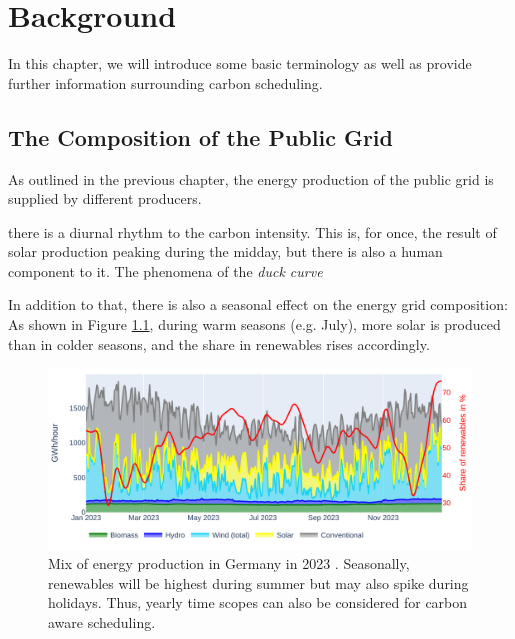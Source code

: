 \chapter{Background}
\label{chap:backgroud}

In this chapter, we will introduce some basic terminology as well as provide further information surrounding carbon scheduling.

\section{The Composition of the Public Grid}

As outlined in the previous chapter, the energy production of the public grid is supplied by different producers.





there is a diurnal rhythm to the carbon intensity. This is, for once, the result of solar production peaking during the midday, but there is also a human component to it. The phenomena of the \emph{duck curve}




In addition to that, there is also a seasonal effect on the energy grid composition:
As shown in Figure \ref{fig:energy_mix_year}, during warm seasons (e.g. July), more solar is produced than in colder seasons, and the share in renewables rises accordingly.

\begin{figure}
    \includegraphics[width=\linewidth]{agorameter/energy_production_year.pdf}
    \caption[short]{Mix of energy production in Germany in 2023 . Seasonally, renewables will be highest during summer but may also spike during holidays. Thus, yearly time scopes can also be considered for carbon aware scheduling.}
    \label{fig:energy_mix_year}
\end{figure}

